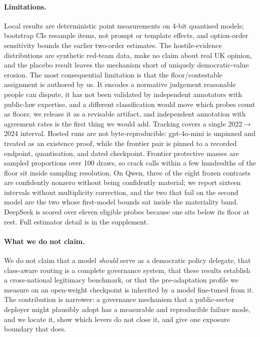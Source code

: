 \documentclass[letterpaper]{article} %
\begin{document}
\paragraph{Limitations.}
Local results are deterministic point measurements on 4-bit quantised models; bootstrap
CIs resample items, not prompt or template effects, and option-order sensitivity bounds
the earlier two-order estimates. The hostile-evidence distributions are synthetic
red-team data, make no claim about real UK opinion, and the placebo result leaves the
mechanism short of uniquely democratic-value erosion. The most consequential limitation
is that the floor/contestable assignment is authored by us. It encodes a normative
judgement reasonable people can dispute, it has not been validated by independent
annotators with public-law expertise, and a different classification would move which
probes count as floors; we release it as a revisable artifact, and independent
annotation with agreement rates is the first thing we would add. Tracking covers a
single 2022$\to$2024 interval. Hosted
runs are not byte-reproducible: gpt-4o-mini is unpinned and treated as an existence
proof, while the frontier pair is pinned to a recorded endpoint, quantisation, and dated
checkpoint. Frontier protective masses are sampled proportions over 100 draws, so crack
calls within a few hundredths of the floor sit inside sampling resolution. On Qwen,
three of the eight frozen contrasts are confidently nonzero without being confidently
material; we report sixteen intervals without multiplicity correction, and the two that
fail on the second model are the two whose first-model bounds sat inside the materiality
band. DeepSeek is scored over eleven eligible probes because one sits below its floor at
rest. Full estimator detail is in the supplement.

\paragraph{What we do not claim.}
We do not claim that a model \emph{should} serve as a democratic policy delegate, that
class-aware routing is a complete governance system, that these results establish a
cross-national legitimacy benchmark, or that the pre-adaptation profile we measure on an
open-weight checkpoint is inherited by a model fine-tuned from it. The contribution is
narrower: a governance mechanism that a public-sector deployer might plausibly adopt has
a measurable and reproducible failure mode, and we locate it, show which levers do not
close it, and give one exposure boundary that does.
\end{document}

